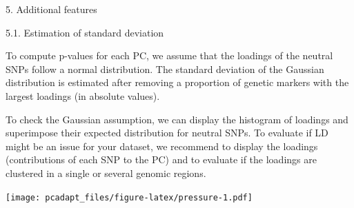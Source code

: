\documentclass[]{article}
\newenvironment{Shaded}{\begin{snugshade}}{\end{snugshade}}
\newcommand{\KeywordTok}[1]{\textcolor[rgb]{0.13,0.29,0.53}{\textbf{#1}}}
\newcommand{\DataTypeTok}[1]{\textcolor[rgb]{0.13,0.29,0.53}{#1}}
\newcommand{\DecValTok}[1]{\textcolor[rgb]{0.00,0.00,0.81}{#1}}
\newcommand{\FloatTok}[1]{\textcolor[rgb]{0.00,0.00,0.81}{#1}}
\newcommand{\StringTok}[1]{\textcolor[rgb]{0.31,0.60,0.02}{#1}}
\newcommand{\ControlFlowTok}[1]{\textcolor[rgb]{0.13,0.29,0.53}{\textbf{#1}}}
\newcommand{\OperatorTok}[1]{\textcolor[rgb]{0.81,0.36,0.00}{\textbf{#1}}}
\newcommand{\NormalTok}[1]{#1}
\begin{document}
5. Additional features

5.1. Estimation of standard deviation

To compute p-values for each PC, we assume that the loadings of the
neutral SNPs follow a normal distribution. The standard deviation of the
Gaussian distribution is estimated after removing a proportion of
genetic markers with the largest loadings (in absolute values).

To check the Gaussian assumption, we can display the histogram of
loadings and superimpose their expected distribution for neutral SNPs.
To evaluate if LD might be an issue for your dataset, we recommend to
display the loadings (contributions of each SNP to the PC) and to
evaluate if the loadings are clustered in a single or several genomic
regions.

\begin{Shaded}
\end{Shaded}

\texttt{[image: pcadapt\_files/figure-latex/pressure-1.pdf]}
\end{document}
